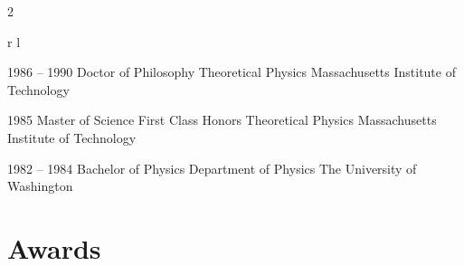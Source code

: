 \documentclass[
	10pt, %
]{FreemanCV}
\begin{document}
\begin{paracol}{2}



\begin{supertabular}{r l} %

	
	\qualificationentry
		{1986 -- 1990} %
		{Doctor of Philosophy} %
		{} %
		{Theoretical Physics} %
		{Massachusetts Institute of Technology} %
	
	
	\qualificationentry
		{1985} %
		{Master of Science} %
		{First Class Honors} %
		{Theoretical Physics} %
		{Massachusetts Institute of Technology} %
	
	
	\qualificationentry
		{1982 -- 1984} %
		{Bachelor of Physics} %
		{} %
		{Department of Physics} %
		{The University of Washington} %
	

\end{supertabular}


\section{Awards}




\end{paracol}
\end{document}
